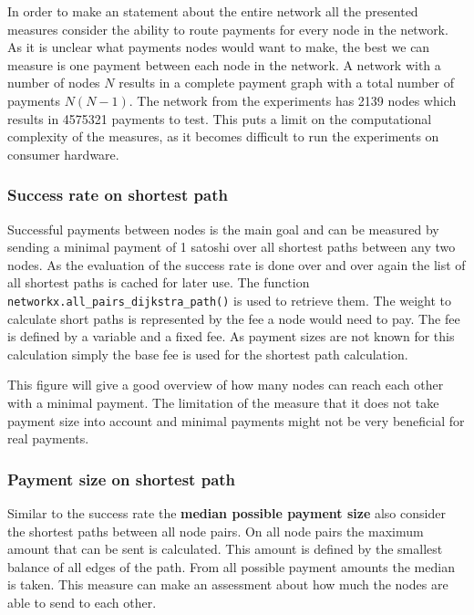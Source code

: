 \documentclass[final]{fhnwreport}       %
\begin{document}
In order to make an statement about the entire network all the presented measures consider the ability to route payments for every node in the network. As it is unclear what payments nodes would want to make, the best we can measure is one payment between each node in the network. A network with a number of nodes $N$ results in a complete payment graph with a total number of payments $N(N-1)$. The network from the experiments has 2139 nodes which results in 4575321 payments to test. This puts a limit on the computational complexity of the measures, as it becomes difficult to run the experiments on consumer hardware.

\subsubsection{Success rate on shortest path}
Successful payments between nodes is the main goal and can be measured by sending a minimal payment of 1 satoshi over all shortest paths between any two nodes. As the evaluation of the success rate is done over and over again the list of all shortest paths is cached for later use. The function \texttt{networkx.all_pairs_dijkstra_path()} is used to retrieve them. The weight to calculate short paths is represented by the fee a node would need to pay. The fee is defined by a variable and a fixed fee. As payment sizes are not known for this calculation simply the base fee is used for the shortest path calculation. 

This figure will give a good overview of how many nodes can reach each other with a minimal payment. The limitation of the measure that it does not take payment size into account and minimal payments might not be very beneficial for real payments.


\subsubsection{Payment size on shortest path}
Similar to the success rate the \textbf{median possible payment size} also consider the shortest paths between all node pairs. On all node pairs the maximum amount that can be sent is calculated. This amount is defined by the smallest balance of all edges of the path. From all possible payment amounts the median is taken. This measure can make an assessment about how much the nodes are able to send to each other. 
\end{document}
